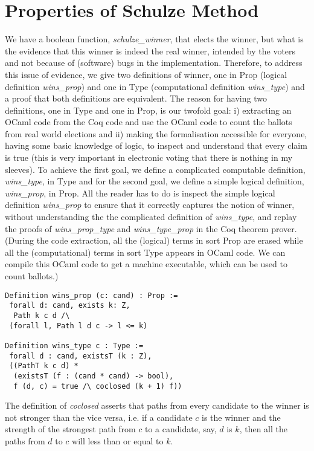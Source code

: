 \documentclass[compsoc,conference,a4paper,10pt,times]{IEEEtran}
\begin{document}
\section{Properties of Schulze Method}
We have a boolean function,  \textit{schulze\_winner},  that 
elects the winner, but what is the evidence that 
this winner is indeed the real winner,  intended by the voters and 
not because of (software) bugs in the implementation. 
Therefore, to address this issue of
evidence, we give two definitions \cite{Pattinson:2017:SVE} of 
winner, one in Prop (logical definition \textit{wins\_prop}) 
and one in Type (computational definition \textit{wins\_type}) 
and a proof that both definitions are equivalent. The reason 
for having two definitions, one in Type and one in Prop, 
is our twofold goal: 
i) extracting an OCaml 
code from the Coq code and use the OCaml code 
to count the ballots from real world elections and ii)
making the formalisation accessible for everyone, having some basic
knowledge of logic, to inspect and understand that every claim 
is true (this is very important in electronic voting that 
there is nothing in my sleeves). To achieve the 
first goal, we define a complicated computable definition, 
\textit{wins\_type}, in Type 
and for the second goal, we define a simple logical definition,
\textit{wins\_prop}, in Prop. 
All the reader has to do is inspect the simple logical definition 
\textit{wins\_prop} to ensure that it correctly captures the notion 
of winner,  without understanding the the complicated
definition of \textit{wins\_type}, and replay the proofs of 
\textit{wins\_prop\_type} and \textit{wins\_type\_prop} in the Coq theorem prover. 
(During the code extraction, all the (logical) terms in sort Prop are erased while 
all the (computational) terms 
in sort Type appears in OCaml code. We can compile this OCaml code to get 
a machine executable, which can be used to count ballots.) 

	  
\begin{verbatim}
Definition wins_prop (c: cand) : Prop := 
 forall d: cand, exists k: Z,
  Path k c d /\ 
 (forall l, Path l d c -> l <= k)
	 
Definition wins_type c : Type :=
 forall d : cand, existsT (k : Z),
 ((PathT k c d) *
  (existsT (f : (cand * cand) -> bool), 
  f (d, c) = true /\ coclosed (k + 1) f))
\end{verbatim}

\noindent
The definition of \textit{coclosed} asserts that
paths from every candidate to the winner 
is not stronger than the vice versa, i.e.
if a candidate $c$ is the winner and the strength 
of the strongest path from $c$ to a candidate,  say, $d$ is $k$, 
then all the paths from $d$ to $c$ will less than or equal to $k$.
\end{document}
